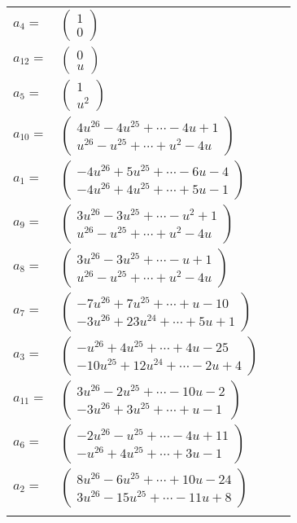 \documentclass[1p]{elsarticle_modified}
\theoremstyle{definition}
\begin{document}
\begin{tabular}{m{7pt} m{180pt} m{7pt} m{180pt} }
\flushright $a_{4}=$&$\begin{pmatrix}1\\0\end{pmatrix}$ \\
\flushright $a_{12}=$&$\begin{pmatrix}0\\u\end{pmatrix}$ \\
\flushright $a_{5}=$&$\begin{pmatrix}1\\u^2\end{pmatrix}$ \\
\flushright $a_{10}=$&$\begin{pmatrix}4 u^{26}-4 u^{25}+\cdots-4 u+1\\u^{26}- u^{25}+\cdots+u^2-4 u\end{pmatrix}$ \\
\flushright $a_{1}=$&$\begin{pmatrix}-4 u^{26}+5 u^{25}+\cdots-6 u-4\\-4 u^{26}+4 u^{25}+\cdots+5 u-1\end{pmatrix}$ \\
\flushright $a_{9}=$&$\begin{pmatrix}3 u^{26}-3 u^{25}+\cdots- u^2+1\\u^{26}- u^{25}+\cdots+u^2-4 u\end{pmatrix}$ \\
\flushright $a_{8}=$&$\begin{pmatrix}3 u^{26}-3 u^{25}+\cdots- u+1\\u^{26}- u^{25}+\cdots+u^2-4 u\end{pmatrix}$ \\
\flushright $a_{7}=$&$\begin{pmatrix}-7 u^{26}+7 u^{25}+\cdots+u-10\\-3 u^{26}+23 u^{24}+\cdots+5 u+1\end{pmatrix}$ \\
\flushright $a_{3}=$&$\begin{pmatrix}- u^{26}+4 u^{25}+\cdots+4 u-25\\-10 u^{25}+12 u^{24}+\cdots-2 u+4\end{pmatrix}$ \\
\flushright $a_{11}=$&$\begin{pmatrix}3 u^{26}-2 u^{25}+\cdots-10 u-2\\-3 u^{26}+3 u^{25}+\cdots+u-1\end{pmatrix}$ \\
\flushright $a_{6}=$&$\begin{pmatrix}-2 u^{26}- u^{25}+\cdots-4 u+11\\- u^{26}+4 u^{25}+\cdots+3 u-1\end{pmatrix}$ \\
\flushright $a_{2}=$&$\begin{pmatrix}8 u^{26}-6 u^{25}+\cdots+10 u-24\\3 u^{26}-15 u^{25}+\cdots-11 u+8\end{pmatrix}$\\&\end{tabular}
\end{document}
